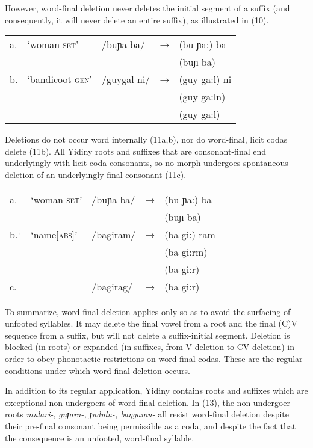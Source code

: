 \documentclass[output=paper,
modfonts
]{LSP/langsci}
\begin{document}
\noindent However, word-final deletion never deletes the initial segment of a suffix (and consequently, it will never delete an entire suffix), as illustrated in (10). 

\ea
\begin{tabular}[t]{@{}lllll}
 a.& `woman-\textsc{set}' & /buɲa-ba/  & → & (bu ɲa:) ba\\
 &&&& \ljudge{*}(buɲ ba) \\
 b. &`bandicoot-\textsc{gen}' & /guygal-ni/  & → & (guy ga:l) ni \\
 &&&& \ljudge{*}(guy ga:ln)\\
 &&&& \ljudge{*}(guy ga:l)\\
 \end{tabular}
 \z
 
\noindent Deletions do not occur word internally (11a,b), nor do word-final, licit codas delete (11b). All Yidiny roots and suffixes that are consonant-final end underlyingly with licit coda consonants, so no morph undergoes spontaneous deletion of an underlyingly-final consonant (11c).

\ea 
\begin{tabular}[t]{@{}lllll}
a. & `woman-\textsc{set}' & /buɲa-ba/  & → & (bu ɲa:) ba \\
&&&& \ljudge{*}(buɲ ba) \\
b.$^{†}$ & `name[\textsc{abs}]' & /bagiram/  & → & (ba gi:) ram \\
&&&& \ljudge{*}(ba gi:rm)\\
&&&& \ljudge{*}(ba gi:r)\\
c. & & \ljudge{*}/bagirag/  & → & \ljudge{*}(ba gi:r)\\
\end{tabular}
\z

\noindent To summarize, word-final deletion applies only so as to avoid the surfacing of unfooted syllables. It may delete the final vowel from a root and the final (C)V sequence from a suffix, but will not delete a suffix-initial segment. Deletion is blocked (in roots) or expanded (in suffixes, from V deletion to CV deletion) in order to obey phonotactic restrictions on word-final codas. These are the regular conditions under which word-final deletion occurs.

In addition to its regular application, Yidiny contains roots and suffixes which are exceptional non-undergoers of word-final deletion. In (13), the non-undergoer roots \textit{mulari-}, \textit{guɟara-, ɟudulu-, baŋgamu-} all resist word-final deletion despite their pre-final consonant being permissible as a coda, and despite the fact that the consequence is an unfooted, word-final syllable.
\end{document}
